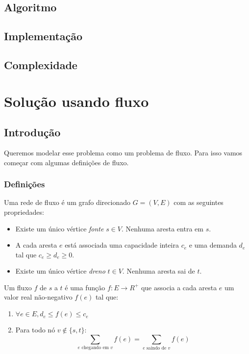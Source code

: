 \documentclass[11pt]{article}
\begin{document}
\subsection{Algoritmo}
\label{sec-2-1}

\subsection{Implementação}
\label{sec-2-2}

\subsection{Complexidade}
\label{sec-2-3}

\section{Solução usando fluxo}
\label{sec-3}

\subsection{Introdução}
\label{sec-3-1}

Queremos modelar esse problema como um problema de fluxo. Para isso
vamos começar com algumas definições de fluxo.

\subsubsection{Definições}
\label{sec-3-1-1}

Uma rede de fluxo é um grafo direcionado $G =
(V, E)$ com as seguintes propriedades:
\begin{itemize}
\item Existe um único vértice \textit{fonte} $s \in V$. Nenhuma aresta entra em $s$.
\item A cada aresta $e$ está associada uma capacidade inteira $c_e$ e
uma demanda $d_e$ tal que $c_e \geq d_e \geq 0$.
\item Existe um único vértice \textit{dreno} $t \in V$. Nenhuma aresta sai de $t$.
\end{itemize}

Um fluxo $f$ de $s$ a $t$ é uma função $f \colon E \to R^+$ que associa a cada
aresta $e$ um valor real não-negativo $f(e)$ tal que:

\begin{enumerate}
\item $\forall e \in E, d_e \leq f(e) \leq c_e$
\item Para todo nó $v \not\in \{s,t\}$:
\[ \sum_{e \text{ chegando em } v} f(e) = \sum_{e \text{ saindo de } v} f(e) \]
\end{enumerate}
\end{document}
